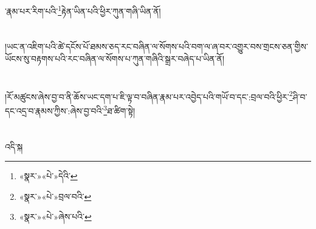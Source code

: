 ་རྣམ་པར་རིག་པའི་\footnote{«སྣར་»«པེ་»དེའི་}རྟེན་ཡིན་པའི་ཕྱིར་ཀུན་གཞི་ཡིན་ནོ།\chapter{ }།ཡང་ན་འཇིག་པའི་ཚེ་དངོས་པོ་ཐམས་ཅད་རང་བཞིན་ལ་སོགས་པའི་བག་ལ་ཞ་བར་འགྱུར་བས་གྲངས་ཅན་གྱིས་ཡོངས་སུ་བརྟགས་པའི་རང་བཞིན་ལ་སོགས་པ་ཀུན་གཞིའི་སྒྲར་བཞེད་པ་ཡིན་ནོ།\chapter{ }།རོ་མཚུངས་ཞེས་བྱ་བ་ནི་ཆོས་ཡང་དག་པ་ཇི་ལྟ་བ་བཞིན་རྣམ་པར་འབྱེད་པའི་གཡོ་བ་དང་:བྲལ་བའི་ཕྱིར་\footnote{«སྣར་»«པེ་»བྲལ་བའི་}ཤི་བ་དང་འདྲ་བ་རྣམས་ཀྱིས་:ཞེས་བྱ་བའི་\footnote{«སྣར་»«པེ་»ཞེས་པའི་}ཐ་ཚིག་སྟེ།\chapter{ }འདི་སྐ